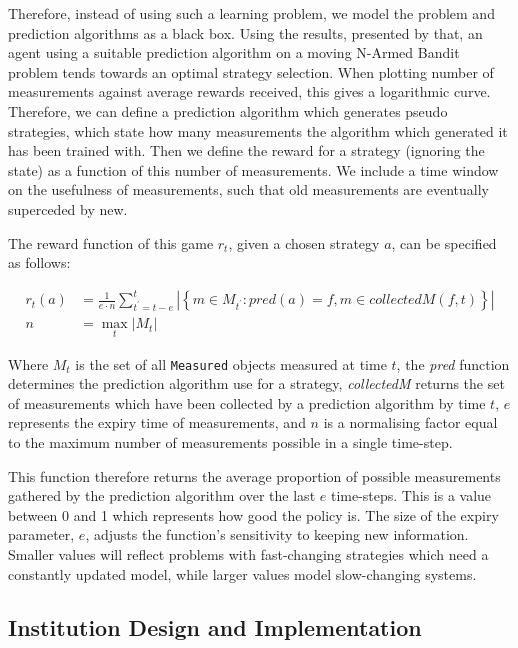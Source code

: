 Therefore, instead of using such a learning problem, we model the problem and
prediction algorithms as a black box. Using the results, presented by
\citet[p.43]{Sutton1998} that, an agent using a suitable prediction algorithm
on a moving N-Armed Bandit problem tends towards an optimal strategy
selection. When plotting number of measurements against average rewards
received, this gives a logarithmic curve. Therefore, we can define a
prediction algorithm which generates pseudo strategies, which state how many
measurements the algorithm which generated it has been trained with. Then we
define the reward for a strategy (ignoring the state) as a
function of this number of measurements. We include a time window on the
usefulness of measurements, such that old measurements are eventually
superceded by new.

The reward function of this game $r_t$, given a chosen strategy $a$, can be specified as follows:

\begin{align*}
r_t(a) &= \frac{1}{e \cdot n} \sum_{t^\prime = t-e}^t \left| \left\{ m \in M_{t^\prime} : \mathit{pred}\left(a \right) = f, m \in \mathit{collectedM}\left(f,t\right) \right\} \right| \\
n &= \max_t |M_t|
\end{align*}

Where $M_t$ is the set of all \texttt{Measured} objects measured at time $t$,
the \emph{pred} function determines the prediction algorithm use for a
strategy, \emph{collectedM} returns the set of measurements which have been
collected by a prediction algorithm by time $t$, $e$ represents the expiry
time of measurements, and $n$ is a normalising factor equal to the maximum
number of measurements possible in a single time-step.

This function therefore returns the average proportion of possible measurements gathered by the prediction algorithm over the last $e$ time-steps. This is a value between 0 and 1 which represents how good the
policy is. The size of the expiry parameter, $e$, adjusts the
function's sensitivity to keeping new information. Smaller values will reflect
problems with fast-changing strategies which need a constantly updated model,
while larger values model slow-changing systems.

\subsection{Institution Design and Implementation}

